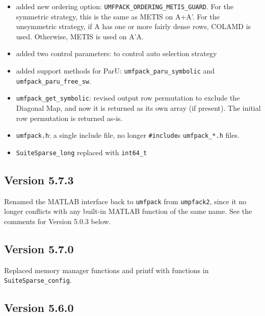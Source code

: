 \documentclass[11pt]{article}
\begin{document}
\begin{itemize}
    \item added new ordering option: \verb'UMFPACK_ORDERING_METIS_GUARD'.  For the
        symmetric strategy, this is the same as METIS on A+A'.  For the
        unsymmetric strategy, if A has one or more fairly dense rows,
        COLAMD is used.  Otherwise, METIS is used on A'A.
    \item added two control parameters: to control auto selection strategy
    \item added support methods for ParU: \verb'umfpack_paru_symbolic' and
        \verb'umfpack_paru_free_sw'.
    \item \verb'umfpack_get_symbolic': revised output row permutation to exclude
        the Diagonal Map, and now it is returned as its own array (if present).
        The initial row permutation is returned as-is.
    \item \verb'umfpack.h': a single include file, no longer \verb'#include's \verb'umfpack_*.h' files.
    \item \verb'SuiteSparse_long' replaced with \verb'int64_t'
\end{itemize}

\subsection{Version 5.7.3}

Renamed the MATLAB interface back to {\tt umfpack} from {\tt umpfack2}, since
it no longer conflicts with any built-in MATLAB function of the same name. 
See the comments for Version 5.0.3 below.

\subsection{Version 5.7.0}

Replaced memory manager functions and printf with functions
in {\tt SuiteSparse\_config}.

\subsection{Version 5.6.0}
\end{document}
